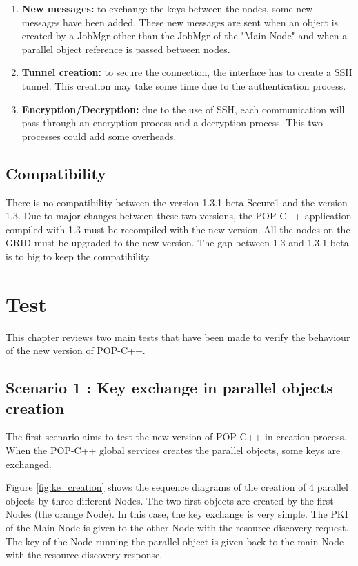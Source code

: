 \begin{enumerate}
\item \textbf{New messages: } to exchange the keys between the nodes, some new messages have been added. These new messages are sent when an object is created by a JobMgr other than the JobMgr of the "Main Node" and when a parallel object reference is passed between nodes.
\item \textbf{Tunnel creation: } to secure the connection, the interface has to create a SSH tunnel. This creation may take some time due to the authentication process.
\item \textbf{Encryption/Decryption: } due to the use of SSH, each communication will pass through an encryption process and a decryption process. This two processes could add some overheads.
\end{enumerate}

\subsection{Compatibility}
There is no compatibility between the version 1.3.1 beta Secure1 and the version 1.3. Due to major changes between these two versions, the POP-C++ application compiled with 1.3 must be recompiled with the new version. All the nodes on the GRID must be upgraded to the new version. The gap between 1.3 and 1.3.1 beta is to big to keep the compatibility.

\pagebreak
\section{Test}
This chapter reviews two main tests that have been made to verify the behaviour of the new version of POP-C++.

\subsection{Scenario 1 : Key exchange in parallel objects creation}
The first scenario aims to test the new version of POP-C++ in creation process. When the POP-C++ global services creates the parallel objects, some keys are exchanged.\s

Figure \ref{fig:ke_creation} shows the sequence diagrams of the creation of 4 parallel objects by three different Nodes. The two first objects are created by the first Nodes (the orange Node). In this case, the key exchange is very simple. The PKI of the Main Node is given to the other Node with the resource discovery request. The key of the Node running the parallel object is given back to the main Node with the resource discovery response. \s

